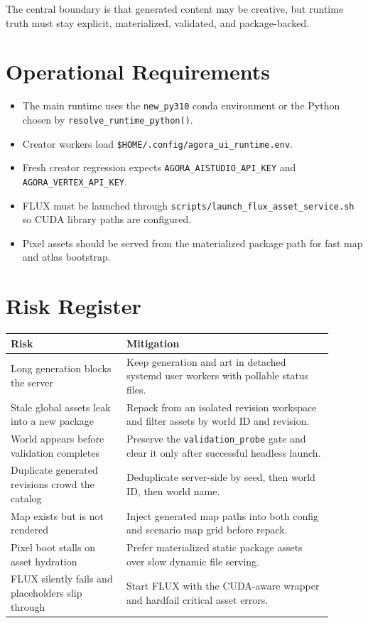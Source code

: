 \documentclass[11pt]{article}
\begin{document}
The central boundary is that generated content may be creative, but runtime truth must stay explicit, materialized, validated, and package-backed.

\section{Operational Requirements}

\begin{itemize}
  \item The main runtime uses the \texttt{new\_py310} conda environment or the Python chosen by \texttt{resolve\_runtime\_python()}.
  \item Creator workers load \texttt{\$HOME/.config/agora\_ui\_runtime.env}.
  \item Fresh creator regression expects \texttt{AGORA\_AISTUDIO\_API\_KEY} and \texttt{AGORA\_VERTEX\_API\_KEY}.
  \item FLUX must be launched through \texttt{scripts/launch\_flux\_asset\_service.sh} so CUDA library paths are configured.
  \item Pixel assets should be served from the materialized package path for fast map and atlas bootstrap.
\end{itemize}

\section{Risk Register}

\begin{longtable}{>{\raggedright\arraybackslash}p{0.32\linewidth}>{\raggedright\arraybackslash}p{0.58\linewidth}}
\textbf{Risk} & \textbf{Mitigation} \\
\hline
Long generation blocks the server & Keep generation and art in detached systemd user workers with pollable status files. \\
Stale global assets leak into a new package & Repack from an isolated revision workspace and filter assets by world ID and revision. \\
World appears before validation completes & Preserve the \texttt{validation\_probe} gate and clear it only after successful headless launch. \\
Duplicate generated revisions crowd the catalog & Deduplicate server-side by seed, then world ID, then world name. \\
Map exists but is not rendered & Inject generated map paths into both config and scenario map grid before repack. \\
Pixel boot stalls on asset hydration & Prefer materialized static package assets over slow dynamic file serving. \\
FLUX silently fails and placeholders slip through & Start FLUX with the CUDA-aware wrapper and hardfail critical asset errors. \\
\end{longtable}
\end{document}
